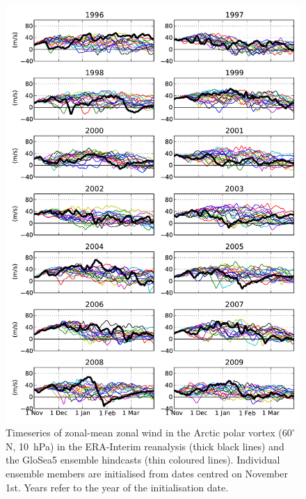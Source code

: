\begin{figure}[p] \vspace*{-3cm} \centering
   \noindent\includegraphics[width=\textwidth]{figures/chapter-seasonal/zm_winds_nh_poststamp.pdf}
   \caption[Timeseries of $\overline{u}$ at 60$^{\circ}$N, 10~hPa, for all
   GloSea5 ensemble members.]{Timeseries of zonal-mean zonal wind in the Arctic
     polar vortex ($60^{\circ}$N, 10~hPa) in the ERA-Interim reanalysis (thick
     black lines) and the GloSea5 ensemble hindcasts (thin coloured
     lines). Individual ensemble members are initialised from dates centred on
     November 1st. Years refer to the year of the initialisation date.}
   \label{fig:nh_poststamp}
\end{figure}

